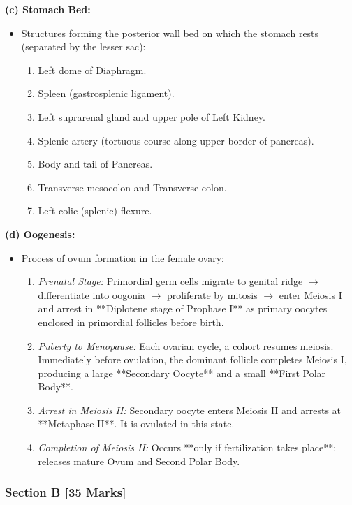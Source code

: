 \documentclass[11pt,a4paper]{article}
\begin{document}
\begin{ansbox}
\textbf{(c) Stomach Bed:}
\begin{itemize}[leftmargin=*]
    \item Structures forming the posterior wall bed on which the stomach rests (separated by the lesser sac):
    \begin{enumerate}
        \item Left dome of Diaphragm.
        \item Spleen (gastrosplenic ligament).
        \item Left suprarenal gland and upper pole of Left Kidney.
        \item Splenic artery (tortuous course along upper border of pancreas).
        \item Body and tail of Pancreas.
        \item Transverse mesocolon and Transverse colon.
        \item Left colic (splenic) flexure.
    \end{enumerate}
\end{itemize}

\textbf{(d) Oogenesis:}
\begin{itemize}[leftmargin=*]
    \item Process of ovum formation in the female ovary:
    \begin{enumerate}
        \item \textit{Prenatal Stage:} Primordial germ cells migrate to genital ridge $\rightarrow$ differentiate into oogonia $\rightarrow$ proliferate by mitosis $\rightarrow$ enter Meiosis I and arrest in **Diplotene stage of Prophase I** as primary oocytes enclosed in primordial follicles before birth.
        \item \textit{Puberty to Menopause:} Each ovarian cycle, a cohort resumes meiosis. Immediately before ovulation, the dominant follicle completes Meiosis I, producing a large **Secondary Oocyte** and a small **First Polar Body**.
        \item \textit{Arrest in Meiosis II:} Secondary oocyte enters Meiosis II and arrests at **Metaphase II**. It is ovulated in this state.
        \item \textit{Completion of Meiosis II:} Occurs **only if fertilization takes place**; releases mature Ovum and Second Polar Body.
    \end{enumerate}
\end{itemize}
\end{ansbox}

\subsubsection{Section B [35 Marks]}
\end{document}
